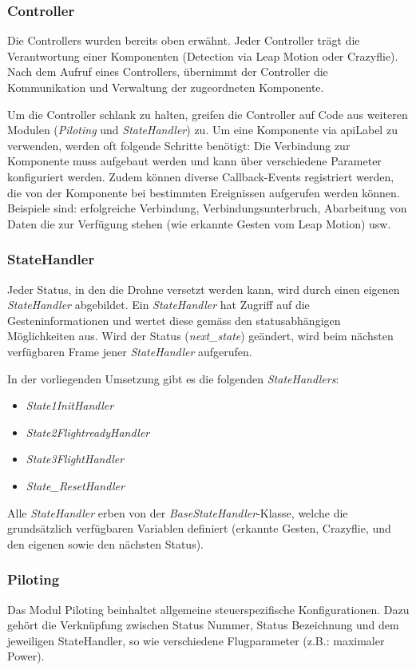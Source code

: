 \subsubsection{Controller}
Die Controllers wurden bereits oben erwähnt. Jeder Controller trägt die Verantwortung einer Komponenten (Detection via Leap Motion oder Crazyflie).
Nach dem Aufruf eines Controllers, übernimmt der Controller die Kommunikation und Verwaltung der zugeordneten Komponente.

Um die Controller schlank zu halten, greifen die Controller auf Code aus weiteren Modulen (\textit{Piloting} und \textit{StateHandler}) zu.
Um eine Komponente via \gls{apiLabel} zu verwenden, werden oft folgende Schritte benötigt:
Die Verbindung zur Komponente muss aufgebaut werden und kann über verschiedene Parameter konfiguriert werden.
Zudem können diverse Callback-Events registriert werden, die von der Komponente bei bestimmten Ereignissen aufgerufen werden können. Beispiele sind: erfolgreiche Verbindung, Verbindungsunterbruch, Abarbeitung von Daten die zur Verfügung stehen (wie erkannte Gesten vom Leap Motion) usw.

\subsubsection{StateHandler}
Jeder Status, in den die Drohne versetzt werden kann, wird durch einen eigenen \textit{StateHandler} abgebildet.
Ein \textit{StateHandler} hat Zugriff auf die Gesteninformationen und wertet diese gemäss den statusabhängigen Möglichkeiten aus.
Wird der Status (\textit{next\_state}) geändert, wird beim nächsten verfügbaren Frame jener \textit{StateHandler} aufgerufen.

In der vorliegenden Umsetzung gibt es die folgenden \textit{StateHandlers}:
\begin{itemize}
	\item \textit{State1InitHandler}
	\item \textit{State2FlightreadyHandler}
	\item \textit{State3FlightHandler}
	\item \textit{State\_ResetHandler}
\end{itemize}
Alle \textit{StateHandler} erben von der \textit{BaseStateHandler}-Klasse, welche die grundsätzlich verfügbaren Variablen definiert (erkannte Gesten, Crazyflie, und den eigenen sowie den nächsten Status).

\subsubsection{Piloting}
Das Modul Piloting beinhaltet allgemeine steuerspezifische Konfigurationen.
Dazu gehört die Verknüpfung zwischen Status Nummer, Status Bezeichnung und dem jeweiligen StateHandler, so wie verschiedene Flugparameter (z.B.: maximaler Power).

